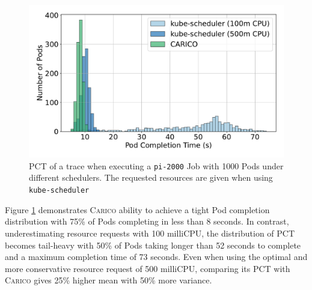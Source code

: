 \begin{figure}[ht!]
    \centering
    \includegraphics[width=\textwidth]{images/pi-pod-completion.pdf}
    \caption{PCT of a trace when executing a \texttt{pi-2000} Job with 1000
    Pods under different schedulers. The requested resources are given when
    using \texttt{kube-scheduler}}
    \label{fig:pi-pod-completion}
\end{figure}

Figure \ref{fig:pi-pod-completion} demonstrates \textsc{Carico} ability to
achieve a tight Pod completion distribution with 75\% of Pods completing in less
than 8 seconds. In contrast, underestimating resource requests with 100
milliCPU, the distribution of PCT becomes tail-heavy with 50\% of Pods taking
longer than 52 seconds to complete and a maximum completion time of 73 seconds.
Even when using the optimal and more conservative resource request of 500
milliCPU, comparing its PCT with \textsc{Carico} gives 25\% higher mean with
50\% more variance.

